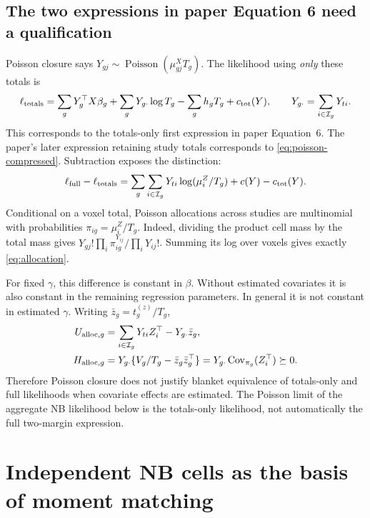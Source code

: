\documentclass[11pt,a4paper]{article}
\newcommand{\Cov}{\operatorname{Cov}}
\numberwithin{equation}{section}
\begin{document}
\subsection{The two expressions in paper Equation 6 need a qualification}
Poisson closure says $Y_{gj}\sim\operatorname{Poisson}(\mu_{gj}^XT_g)$.
The likelihood using \emph{only} these totals is
\begin{equation}
 \ell_{\rm totals}
 =\sum_g Y_g^\top X\beta_g+\sum_g Y_{g\cdot}\log T_g-\sum_gh_gT_g+c_{\rm tot}(Y),
 \qquad Y_{g\cdot}=\sum_{i\in\mathcal I_g}Y_{ti} .
\end{equation}
This corresponds to the totals-only first expression in paper Equation~6.
The paper's later expression retaining study totals corresponds to
\eqref{eq:poisson-compressed}. Subtraction exposes the distinction:
\begin{equation}
 \ell_{\rm full}-\ell_{\rm totals}
 =\sum_g\sum_{i\in\mathcal I_g}Y_{ti}\log(\mu_i^Z/T_g)
       +c(Y)-c_{\rm tot}(Y). \label{eq:allocation}
\end{equation}
Conditional on a voxel total, Poisson allocations across studies are
multinomial with probabilities $\pi_{ig}=\mu_i^Z/T_g$.
Indeed, dividing the product cell mass by the total mass gives
$Y_{gj}!\prod_i\pi_{ig}^{Y_{ij}}/\prod_iY_{ij}!$.
Summing its log over voxels gives exactly \eqref{eq:allocation}.

For fixed $\gamma$, this difference is constant in $\beta$.
Without estimated covariates it is also constant in the remaining
regression parameters. In general it is not constant in estimated $\gamma$.
Writing $\bar z_g=t_g^{(z)}/T_g$,
\begin{align}
 U_{{\rm alloc},g}&=\sum_{i\in\mathcal I_g}Y_{ti}{Z_i^\top}-Y_{g\cdot}\bar z_g,\\
 H_{{\rm alloc},g}
 &=Y_{g\cdot}\{V_g/T_g-\bar z_g\bar z_g^\top\}
 =Y_{g\cdot}\Cov_{\pi_g}({Z_i^\top})\succeq0 .
\end{align}
Therefore Poisson closure does not justify blanket equivalence of
totals-only and full likelihoods when covariate effects are estimated.
The Poisson limit of the aggregate NB likelihood below is the totals-only
likelihood, not automatically the full two-margin expression.

\section{Independent NB cells as the basis of moment matching}\label{sec:cellnb}
\end{document}
